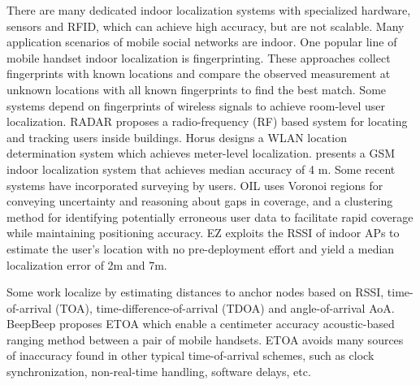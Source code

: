There are many dedicated indoor localization systems with specialized hardware, \eg sensors and RFID,
 which can achieve high accuracy, but are not scalable.
Many application scenarios of mobile social networks are indoor.
One popular line of mobile handset indoor localization is fingerprinting.
These approaches collect fingerprints with known locations
 and compare the observed measurement at unknown locations with
 all known fingerprints to find the best match.
Some systems depend on fingerprints of wireless signals to achieve room-level user localization.
RADAR \cite{bahl2000radar} proposes a radio-frequency (RF) based system
 for locating and tracking users inside buildings.
Horus \cite{youssef2008horus} designs a WLAN location determination system
 which achieves meter-level localization.
\cite{varshavsky2007gsm} presents a GSM indoor
localization system that achieves median accuracy of 4 m.
Some recent systems have incorporated surveying by users.
OIL \cite{park2010growing} uses Voronoi regions for conveying uncertainty and reasoning about gaps in coverage, and a clustering method for identifying potentially erroneous user data to facilitate rapid coverage while maintaining positioning accuracy.
EZ \cite{chintalapudi2010indoor} exploits the RSSI of indoor APs to estimate the user's location with no pre-deployment effort and yield a median localization error of 2m and 7m.


Some work localize by estimating distances to anchor nodes
 based on RSSI, time-of-arrival (TOA), time-difference-of-arrival (TDOA) and angle-of-arrival AoA.
BeepBeep \cite{peng2007beepbeep} proposes ETOA which enable a centimeter accuracy acoustic-based
 ranging method between a pair of mobile handsets.
ETOA avoids many sources of inaccuracy found in other typical time-of-arrival
schemes, such as clock synchronization, non-real-time handling,
software delays, etc.

